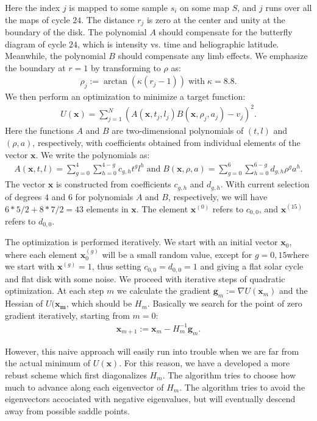 \documentclass{aa}
\newcommand{\eqnl}[2]{\begin{eqnarray}\label{#1}#2\end{eqnarray}}
\begin{document}
  Here the index $j$ is mapped to some sample $s_i$ on some map $S$, and $j$ runs over all the maps of cycle $24$. The 
  distance $r_j$ is zero at the center and unity at the boundary of the disk.
    The polynomial $A$ should compensate for the butterfly diagram of cycle $24$, which is intensity vs. time and heliographic latitude. Meanwhile, the polynomial $B$ should compensate any limb effects.
  We emphasize the boundary at $r=1$ by transforming to $\rho$ as:
  \eqnl{physical_radius_trans}{
  \rho_j := \arctan \left( \kappa \left( r_j - 1 \right)\right) \; \text{with} \; \kappa = 8.8 \text{.}
  }
  We then perform an optimization to 
  minimize a target function:
  \eqnl{physical_radius_target}{
  U(\bm{x}) = \sum \limits_{j=1}^{N} \left( A(\bm{x},t_j,l_j) B(\bm{x},\rho_j,a_j) - v_j \right)^2 \text{.}
  }
  Here the functions $A$ and $B$ are two-dimensional polynomials of $(t,l)$ and $(\rho,a)$, respectively, with coefficients obtained from individual elements of the vector $\bm{x}$. We write the polynomials as:
  \eqnl{physical_radius_polynomials}{
  A(\bm{x},t,l) = \sum \limits_{g=0}^{4} \sum \limits_{h=0}^{4-g} c_{g,h} t^g l^h \; \text{and} \;
  B(\bm{x},\rho,a) = \sum \limits_{g=0}^{6} \sum \limits_{h=0}^{6-g} d_{g,h} \rho^g a^h \text{.}
  }
  The vector $\bm{x}$ is constructed from coefficients $c_{g,h}$ and $d_{g,h}$. With current selection of degrees $4$ 
  and $6$ for polynomials $A$ and $B$, respectively, we will have $6*5/2 + 8*7/2 = 43$ elements in $\bm{x}$. The element 
  $\bm{x}^{(0)}$ refers to $c_{0,0}$, and $\bm{x}^{(15)}$ refers to $d_{0,0}$.

  The optimization is performed iteratively. We start with an initial vector $\bm{x}_0$, where each element 
  $\bm{x}_0^{(g)}$ will be a small random value, except for $g=0,15$where we start with $\bm{x}^{(g)} = 1$, thus 
  setting $c_{0,0} = d_{0,0} = 1$ and giving a flat solar cycle and flat disk with some noise. We proceed with iterative 
  steps of quadratic optimization. At each step $m$ we calculate the gradient $\bm{g}_m := \nabla U(\bm{x}_m)$ and the Hessian of $U(\bm{x_m}$, which should be $H_m$. Basically we search for the point of zero gradient iteratively, starting from $m=0$:
  \eqnl{physical_radius_step}{
  \bm{x}_{m+1} := \bm{x}_m - H_m^{-1} \bm{g}_m \text{.}
  }

  However, this naive approach will easily run into trouble when we are far from the actual minimum of $U(\bm{x})$. For 
  this reason, we have a developed a more rebust scheme which first diagonalizes $H_m$. The algorithm tries to choose 
  how much to advance along each eigenvector of $H_m$. The algorithm tries to avoid the eigenvectors accociated with 
  negative eigenvalues, but will eventually descend away from possible saddle points.
  
\end{document}
